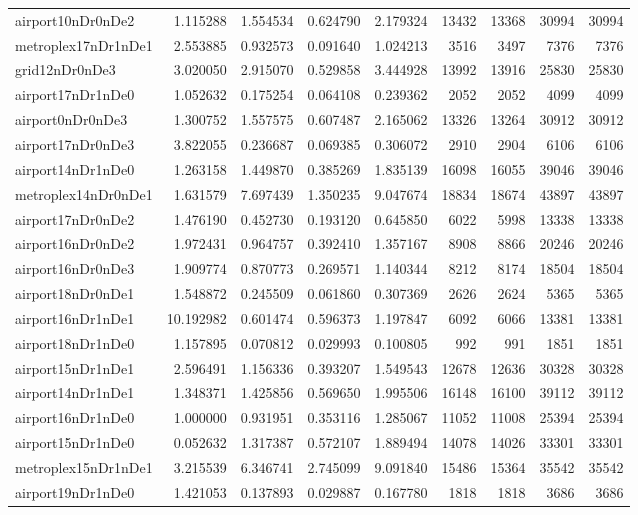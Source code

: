 \begin{longtable}{|l|r|r|r|r|r|r|r|r|}
airport10nDr0nDe2 & 1.115288 & 1.554534 & 0.624790 & 2.179324 & 13432 & 13368 & 30994 & 30994 \\
metroplex17nDr1nDe1 & 2.553885 & 0.932573 & 0.091640 & 1.024213 & 3516 & 3497 & 7376 & 7376 \\
grid12nDr0nDe3 & 3.020050 & 2.915070 & 0.529858 & 3.444928 & 13992 & 13916 & 25830 & 25830 \\
airport17nDr1nDe0 & 1.052632 & 0.175254 & 0.064108 & 0.239362 & 2052 & 2052 & 4099 & 4099 \\
airport0nDr0nDe3 & 1.300752 & 1.557575 & 0.607487 & 2.165062 & 13326 & 13264 & 30912 & 30912 \\
airport17nDr0nDe3 & 3.822055 & 0.236687 & 0.069385 & 0.306072 & 2910 & 2904 & 6106 & 6106 \\
airport14nDr1nDe0 & 1.263158 & 1.449870 & 0.385269 & 1.835139 & 16098 & 16055 & 39046 & 39046 \\
metroplex14nDr0nDe1 & 1.631579 & 7.697439 & 1.350235 & 9.047674 & 18834 & 18674 & 43897 & 43897 \\
airport17nDr0nDe2 & 1.476190 & 0.452730 & 0.193120 & 0.645850 & 6022 & 5998 & 13338 & 13338 \\
airport16nDr0nDe2 & 1.972431 & 0.964757 & 0.392410 & 1.357167 & 8908 & 8866 & 20246 & 20246 \\
airport16nDr0nDe3 & 1.909774 & 0.870773 & 0.269571 & 1.140344 & 8212 & 8174 & 18504 & 18504 \\
airport18nDr0nDe1 & 1.548872 & 0.245509 & 0.061860 & 0.307369 & 2626 & 2624 & 5365 & 5365 \\
airport16nDr1nDe1 & 10.192982 & 0.601474 & 0.596373 & 1.197847 & 6092 & 6066 & 13381 & 13381 \\
airport18nDr1nDe0 & 1.157895 & 0.070812 & 0.029993 & 0.100805 & 992 & 991 & 1851 & 1851 \\
airport15nDr1nDe1 & 2.596491 & 1.156336 & 0.393207 & 1.549543 & 12678 & 12636 & 30328 & 30328 \\
airport14nDr1nDe1 & 1.348371 & 1.425856 & 0.569650 & 1.995506 & 16148 & 16100 & 39112 & 39112 \\
airport16nDr1nDe0 & 1.000000 & 0.931951 & 0.353116 & 1.285067 & 11052 & 11008 & 25394 & 25394 \\
airport15nDr1nDe0 & 0.052632 & 1.317387 & 0.572107 & 1.889494 & 14078 & 14026 & 33301 & 33301 \\
metroplex15nDr1nDe1 & 3.215539 & 6.346741 & 2.745099 & 9.091840 & 15486 & 15364 & 35542 & 35542 \\
airport19nDr1nDe0 & 1.421053 & 0.137893 & 0.029887 & 0.167780 & 1818 & 1818 & 3686 & 3686 \\

\end{longtable}
